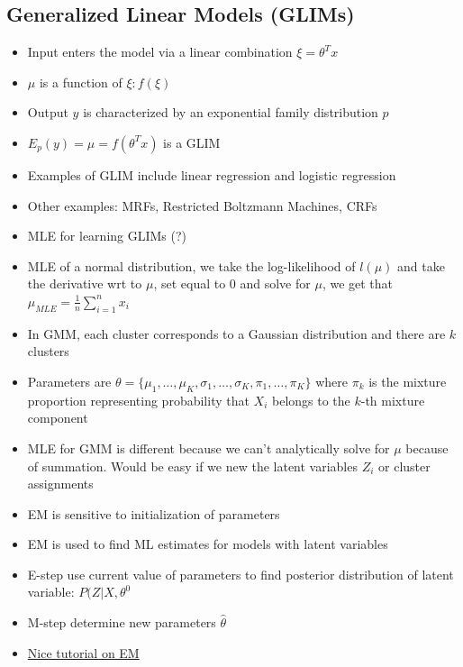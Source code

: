 \documentclass[../main.tex]{subfiles}
\begin{document}
\subsection{Generalized Linear Models (GLIMs)}
  \begin{itemize}
    \item Input enters the model via a linear combination $\xi = \theta^{T}x$
    \item $\mu$ is a function of $\xi: f(\xi)$
    \item Output $y$ is characterized by an exponential family distribution $p$
    \item $E_{p}(y) = \mu = f(\theta^{T}x)$ is a GLIM
    \item Examples of GLIM include linear regression and logistic regression
    \item Other examples: MRFs, Restricted Boltzmann Machines, CRFs
    \item MLE for learning GLIMs (?)
    \item MLE of a normal distribution, we take the log-likelihood of $l(\mu)$ and take the derivative wrt to $\mu$, set equal to 0 and solve for $\mu$, we get that $\mu_{MLE} = \frac{1}{n} \sum_{i=1}^{n} x_{i}$
    \item In GMM, each cluster corresponds to a Gaussian distribution and there are $k$ clusters
    \item Parameters are $\theta = \{\mu_{1}, \dotsc, \mu_{K}, \sigma_{1}, \dotsc, \sigma_{K}, \pi_{1}, \dotsc, \pi_{K}\}$ where $\pi_{k}$ is the mixture proportion representing probability that $X_{i}$ belongs to the $k$-th mixture component
    \item MLE for GMM is different because we can't analytically solve for $\mu$ because of summation. Would be easy if we new the latent variables $Z_{i}$ or cluster assignments
    \item EM is sensitive to initialization of parameters
    \item EM is used to find ML estimates for models with latent variables
    \item E-step use current value of parameters to find posterior distribution of latent variable: $P(Z|X, \theta^{0}$
    \item M-step determine new parameters $\hat{\theta}$
    \item \href{https://stephens999.github.io/fiveMinuteStats/intro_to_em.html}{Nice tutorial on EM}
  \end{itemize}
\end{document}
